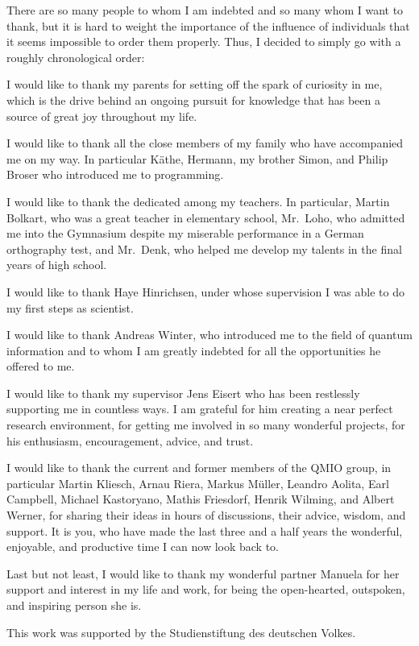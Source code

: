 \documentclass[a4paper,12pt,listof=totoc,index=totoc,bibliography=totoc,headsepline=false,headings=normal,BCOR16.153846mm,DIV12,headinclude,twoside,cleardoublepage=empty,numbers=noenddot,final]{scrreprt}
\theoremstyle{mystyle}
\numberwithin{equation}{section}
\numberwithin{figure}{section}
\numberwithin{lemma}{section}
\numberwithin{theorem}{section}
\numberwithin{corollary}{section}
\numberwithin{definition}{section}
\numberwithin{conjecture}{section}
\numberwithin{observation}{section}
\newcommand{\+}{\mkern2mu}
\DeclareMathOperator{\1}{\mathds{1}}
\begin{document}
There are so many people to whom I am indebted and so many whom I want to thank, but it is hard to weight the importance of the influence of individuals that it seems impossible to order them properly.
Thus, I decided to simply go with a roughly chronological order:

I would like to thank my parents for setting off the spark of curiosity in me, which is the drive behind an ongoing pursuit for knowledge that has been a source of great joy throughout my life.

I would like to thank all the close members of my family who have accompanied me on my way.
In particular Käthe, Hermann, my brother Simon, and Philip Broser who introduced me to programming.

I would like to thank the dedicated among my teachers. In particular, Martin Bolkart, who was a great teacher in elementary school, Mr.\ Loho, who admitted me into the Gymnasium despite my miserable performance in a German orthography test, and Mr.\ Denk, who helped me develop my talents in the final years of high school.

I would like to thank Haye Hinrichsen, under whose supervision I was able to do my first steps as scientist.

I would like to thank Andreas Winter, who introduced me to the field of quantum information and to whom I am greatly indebted for all the opportunities he offered to me.

I would like to thank my supervisor Jens Eisert who has been restlessly supporting me in countless ways.
I am grateful for him creating a near perfect research environment, for getting me involved in so many wonderful projects, for his enthusiasm, encouragement, advice, and trust.

I would like to thank the current and former members of the QMIO group, in particular Martin Kliesch, Arnau Riera, Markus Müller, Leandro Aolita, Earl Campbell, Michael Kastoryano, Mathis Friesdorf, Henrik Wilming, and Albert Werner, for sharing their ideas in hours of discussions, their advice, wisdom, and support. 
It is you, who have made the last three and a half years the wonderful, enjoyable, and productive time I can now look back to.

Last but not least, I would like to thank my wonderful partner Manuela for her support and interest in my life and work, for being the open-hearted, outspoken, and inspiring person she is.

This work was supported by the Studienstiftung des deutschen Volkes.
\end{document}
